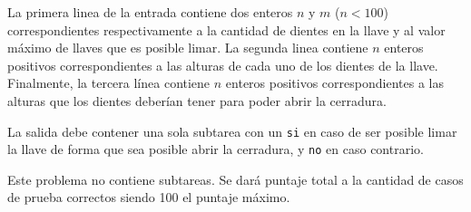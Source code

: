 \documentclass{oci}
\begin{document}
\begin{inputDescription}
La primera linea de la entrada contiene dos enteros $n$ y $m$ ($n<100$) correspondientes
respectivamente a la cantidad de dientes en la llave y al valor máximo de llaves
que es posible limar.
La segunda linea contiene $n$ enteros positivos correspondientes a las alturas de cada uno
de los dientes de la llave.
Finalmente, la tercera línea contiene $n$ enteros positivos correspondientes a las alturas que los
dientes deberían tener para poder abrir la cerradura.
\end{inputDescription}

\begin{outputDescription}
La salida debe contener una sola subtarea con un \verb|si| en caso de ser posible
limar la llave de forma que sea posible abrir la cerradura, y \verb|no| en caso contrario.
\end{outputDescription}

\begin{scoreDescription}
  Este problema no contiene subtareas.
  Se dará puntaje total a la cantidad de casos de prueba correctos siendo 100 el puntaje
  máximo.
\end{scoreDescription}

\begin{sampleDescription}
\end{sampleDescription}
\end{document}
